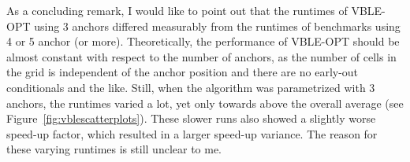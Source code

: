 As a concluding remark, I would like to point out that the runtimes of VBLE-OPT using 3 anchors differed measurably from the runtimes of benchmarks using 4 or 5 anchor (or more). Theoretically, the performance of VBLE-OPT should be almost constant with respect to the number of anchors, as the number of cells in the grid is independent of the anchor position and there are no early-out conditionals and the like. Still, when the algorithm was parametrized with 3 anchors, the runtimes varied a lot, yet only towards above the overall average (see Figure~\ref{fig:vblescatterplots}). These slower runs also showed a slightly worse speed-up factor, which resulted in a larger speed-up variance. The reason for these varying runtimes is still unclear to me.
